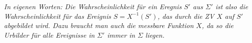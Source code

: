 \documentclass[paper=a4,10pt]{scrartcl}
\begin{document}
\noindent
\textit{In eigenen Worten: Die Wahrscheinlichkeit für ein Eregnis $S'$ aus $\Sigma'$ ist also die Wahrscheinlichkeit für das Ereignis $S = X^{-1}(S')$, das durch die ZV $X$ auf $S'$ abgebildet wird. Dazu braucht man auch die messbare Funktion $X$, da so die Urbilder für alle Ereignisse in $\Sigma'$ immer in $\Sigma$ liegen.}



\end{document}
